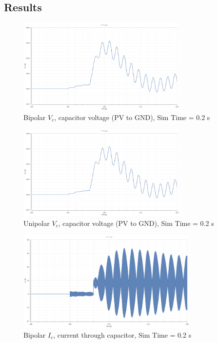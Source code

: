\documentclass[12pt,twoside]{scrartcl}
\begin{document}
\subsection{Results}
\begin{figure}[htp]
    \centering
    \includegraphics[width=0.75\textwidth]{Bipolar_Vc_0.2.png}
    \caption{Bipolar $V_c$, capacitor voltage (PV to GND), Sim Time = 0.2 s}
    \label{fig:BipolarVc0.2}
\end{figure}
\begin{figure}[htp]
    \centering
    \includegraphics[width=0.75\textwidth]{Unipolar_Vc_0.2.png}
    \caption{Unipolar $V_c$, capacitor voltage (PV to GND), Sim Time = 0.2 s}
    \label{fig:UnipolarVc0.2}
\end{figure}
\begin{figure}[htp]
    \centering
    \includegraphics[width=0.8\textwidth]{Bipolar_Ic_0.2.png}
    \caption{Bipolar $I_c$, current through capacitor, Sim Time = 0.2 s}
    \label{fig:BipolarIc0.2}
\end{figure}
\end{document}
